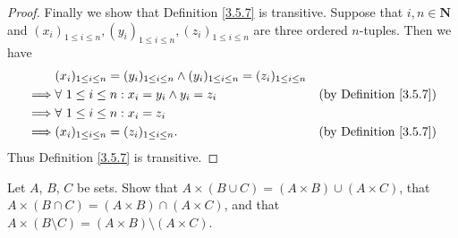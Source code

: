 \begin{proof}
Finally we show that Definition \ref{3.5.7} is transitive.
Suppose that \(i, n \in \mathbf{N}\) and \((x_i)_{1 \leq i \leq n}, (y_i)_{1 \leq i \leq n}, (z_i)_{1 \leq i \leq n}\) are three ordered \(n\)-tuples.
Then we have
\begin{align*}
& (x_i)_{1 \leq i \leq n} = (y_i)_{1 \leq i \leq n} \land (y_i)_{1 \leq i \leq n} = (z_i)_{1 \leq i \leq n} \\
\implies & \forall\ 1 \leq i \leq n : x_i = y_i \land y_i = z_i & \text{(by Definition \ref{3.5.7})} \\
\implies & \forall\ 1 \leq i \leq n : x_i = z_i \\
\implies & (x_i)_{1 \leq i \leq n} = (z_i)_{1 \leq i \leq n}. & \text{(by Definition \ref{3.5.7})}
\end{align*}
Thus Definition \ref{3.5.7} is transitive.
\end{proof}

\begin{exercise}\label{ex 3.5.4}
Let \(A\), \(B\), \(C\) be sets.
Show that \(A \times (B \cup C) = (A \times B) \cup (A \times C)\), that \(A \times (B \cap C) = (A \times B) \cap (A \times C)\), and that \(A \times (B \setminus C) = (A \times B) \setminus (A \times C)\).
\end{exercise}

